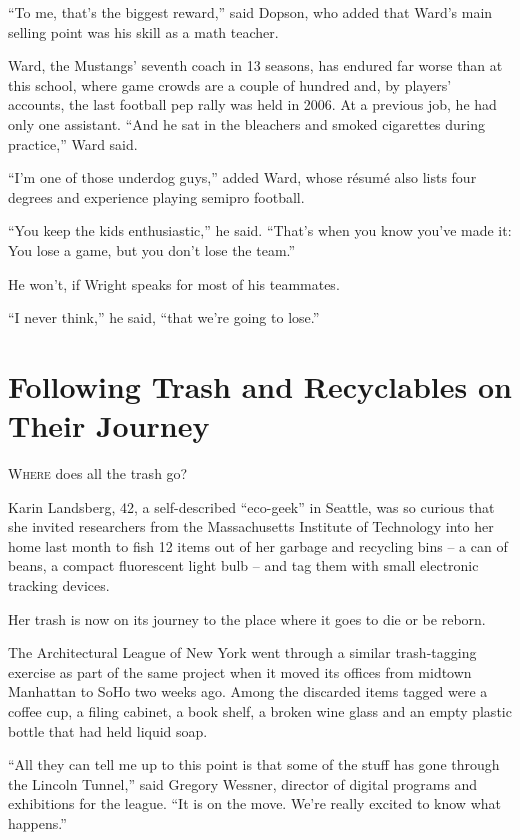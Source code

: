﻿\documentclass[12pt]{article}
\begin{document}
``To me, that's the biggest reward,'' said Dopson, who added that Ward's main selling point was his
skill as a math teacher.

Ward, the Mustangs' seventh coach in 13 seasons, has endured far worse than at this school, where
game crowds are a couple of hundred and, by players' accounts, the last football pep rally was held
in 2006. At a previous job, he had only one assistant. ``And he sat in the bleachers and smoked
cigarettes during practice,'' Ward said.

``I'm one of those underdog guys,'' added Ward, whose r\'esum\'e also lists four degrees and
experience playing semipro football.

``You keep the kids enthusiastic,'' he said. ``That's when you know you've made it: You lose a game,
but you don't lose the team.''

He won't, if Wright speaks for most of his teammates.

``I never think,'' he said, ``that we're going to lose.''

\section{Following Trash and Recyclables on Their Journey}

\lettrine{W}{here} does all the trash go?

Karin Landsberg, 42, a self-described ``eco-geek'' in Seattle, was so curious that she invited
researchers from the Massachusetts Institute of Technology into her home last month to fish 12 items
out of her garbage and recycling bins -- a can of beans, a compact fluorescent light bulb -- and tag
them with small electronic tracking devices.

Her trash is now on its journey to the place where it goes to die or be reborn.

The Architectural League of New York went through a similar trash-tagging exercise as part of the
same project when it moved its offices from midtown Manhattan to SoHo two weeks ago. Among the
discarded items tagged were a coffee cup, a filing cabinet, a book shelf, a broken wine glass and an
empty plastic bottle that had held liquid soap.

``All they can tell me up to this point is that some of the stuff has gone through the Lincoln
Tunnel,'' said Gregory Wessner, director of digital programs and exhibitions for the league. ``It is
on the move. We're really excited to know what happens.''
\end{document}
